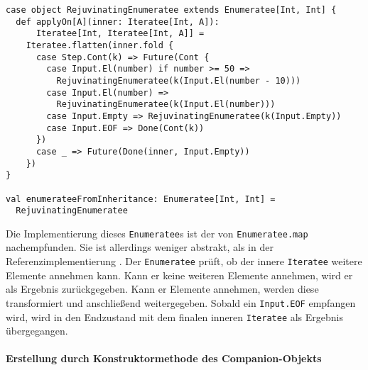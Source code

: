 \begin{lstlisting}[caption=Erstellung eines Enumeratees durch Vererbung, label=lst:enumerateeerstellung_durch_vererbung]
case object RejuvinatingEnumeratee extends Enumeratee[Int, Int] {
  def applyOn[A](inner: Iteratee[Int, A]):
      Iteratee[Int, Iteratee[Int, A]] =
    Iteratee.flatten(inner.fold {
      case Step.Cont(k) => Future(Cont {
        case Input.El(number) if number >= 50 =>
          RejuvinatingEnumeratee(k(Input.El(number - 10)))
        case Input.El(number) =>
          RejuvinatingEnumeratee(k(Input.El(number)))
        case Input.Empty => RejuvinatingEnumeratee(k(Input.Empty))
        case Input.EOF => Done(Cont(k))
      })
      case _ => Future(Done(inner, Input.Empty))
    })
}

val enumerateeFromInheritance: Enumeratee[Int, Int] =
  RejuvinatingEnumeratee
\end{lstlisting}

Die Implementierung dieses \lstinline|Enumeratee|s ist der von \lstinline|Enumeratee.map| nachempfunden.
Sie ist allerdings weniger abstrakt, als in der Referenzimplementierung \cite[vgl.][Z.~268, Z.~174 und Z.~81]{play_enumeratee_source_code}.
Der \lstinline|Enumeratee| prüft, ob der innere \lstinline|Iteratee| weitere Elemente annehmen kann.
Kann er keine weiteren Elemente annehmen, wird er als Ergebnis zurückgegeben.
Kann er Elemente annehmen, werden diese transformiert und anschließend weitergegeben.
Sobald ein \lstinline|Input.EOF| empfangen wird, wird in den Endzustand mit dem finalen inneren \lstinline|Iteratee| als Ergebnis übergegangen.


\paragraph{Erstellung durch Konstruktormethode des Companion-Objekts} %
\label{par:enumerateeerstellung_durch_konstruktormethode_des_companion_objekts}\mbox{} %

